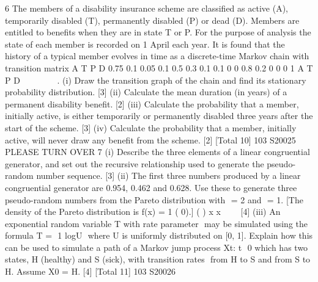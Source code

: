 \documentclass[a4paper,12pt]{article}
\begin{document}
\begin{enumerate}6 The members of a disability insurance scheme are classified as active (A),
temporarily disabled (T), permanently disabled (P) or dead (D). Members are
entitled to benefits when they are in state T or P. For the purpose of analysis the state
of each member is recorded on 1 April each year. It is found that the history of a
typical member evolves in time as a discrete-time Markov chain with transition matrix
A
T
P
D
0.75 0.1 0.05 0.1
0.5 0.3 0.1 0.1
0 0 0.8 0.2
0 0 0 1
A T P D
 
 
 
 
 
 
.
(i) Draw the transition graph of the chain and find its stationary probability
distribution. [3]
(ii) Calculate the mean duration (in years) of a permanent disability benefit. [2]
(iii) Calculate the probability that a member, initially active, is either temporarily
or permanently disabled three years after the start of the scheme. [3]
(iv) Calculate the probability that a member, initially active, will never draw any
benefit from the scheme. [2]
[Total 10]
103 S20025 PLEASE TURN OVER
7 (i) Describe the three elements of a linear congruential generator, and set out the
recursive relationship used to generate the pseudo-random number sequence.
[3]
(ii) The first three numbers produced by a linear congruential generator are 0.954,
0.462 and 0.628. Use these to generate three pseudo-random numbers from
the Pareto distribution with  = 2 and  = 1.
[The density of the Pareto distribution is f(x) = 1 ( 0).]
( )
x
x




 
[4]
(iii) An exponential random variable T with rate parameter  may be simulated
using the formula
T =  1 logU

where U is uniformly distributed on [0, 1]. Explain how this can be used to
simulate a path of a Markov jump process {Xt: t  0} which has two states,
H (healthy) and S (sick), with transition rates  from H to S and 	 from S to H.
Assume X0 = H. [4]
[Total 11]
103 S20026




\end{enumerate}
\end{document}
